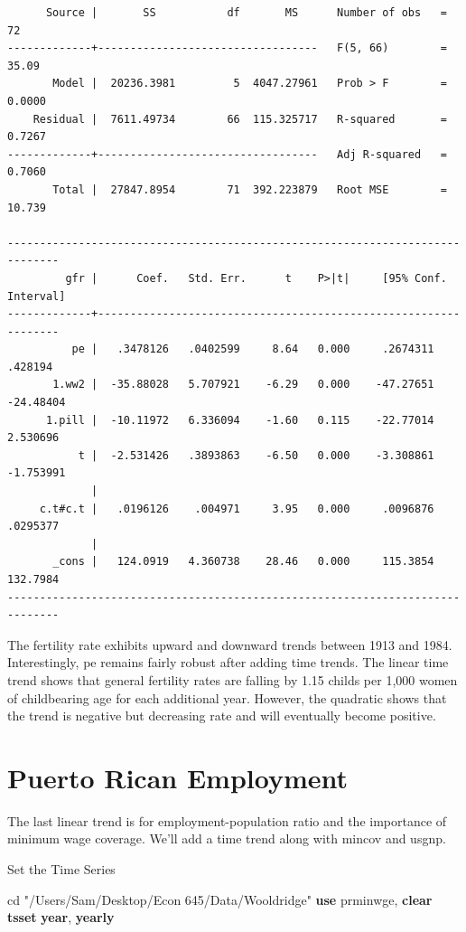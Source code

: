 \documentclass[
]{book}
\newenvironment{Shaded}{\begin{snugshade}}{\end{snugshade}}
\newcommand{\FunctionTok}[1]{\textcolor[rgb]{0.13,0.29,0.53}{\textbf{#1}}}
\newcommand{\KeywordTok}[1]{\textcolor[rgb]{0.13,0.29,0.53}{\textbf{#1}}}
\newcommand{\NormalTok}[1]{#1}
\newcommand{\StringTok}[1]{\textcolor[rgb]{0.31,0.60,0.02}{#1}}
\begin{document}
\begin{verbatim}
      Source |       SS           df       MS      Number of obs   =        72
-------------+----------------------------------   F(5, 66)        =     35.09
       Model |  20236.3981         5  4047.27961   Prob > F        =    0.0000
    Residual |  7611.49734        66  115.325717   R-squared       =    0.7267
-------------+----------------------------------   Adj R-squared   =    0.7060
       Total |  27847.8954        71  392.223879   Root MSE        =    10.739

------------------------------------------------------------------------------
         gfr |      Coef.   Std. Err.      t    P>|t|     [95% Conf. Interval]
-------------+----------------------------------------------------------------
          pe |   .3478126   .0402599     8.64   0.000     .2674311     .428194
       1.ww2 |  -35.88028   5.707921    -6.29   0.000    -47.27651   -24.48404
      1.pill |  -10.11972   6.336094    -1.60   0.115    -22.77014    2.530696
           t |  -2.531426   .3893863    -6.50   0.000    -3.308861   -1.753991
             |
     c.t#c.t |   .0196126    .004971     3.95   0.000     .0096876    .0295377
             |
       _cons |   124.0919   4.360738    28.46   0.000     115.3854    132.7984
------------------------------------------------------------------------------
\end{verbatim}

The fertility rate exhibits upward and downward trends between 1913 and 1984.
Interestingly, pe remains fairly robust after adding time trends. The linear
time trend shows that general fertility rates are falling by 1.15 childs per 1,000
women of childbearing age for each additional year. However, the quadratic shows
that the trend is negative but decreasing rate and will eventually become positive.

\section{Puerto Rican Employment}\label{puerto-rican-employment}

The last linear trend is for employment-population ratio and the importance of minimum wage
coverage. We'll add a time trend along with mincov and usgnp.

Set the Time Series

\begin{Shaded}
\begin{Highlighting}[]
\NormalTok{cd }\StringTok{"/Users/Sam/Desktop/Econ 645/Data/Wooldridge"}
\KeywordTok{use}\NormalTok{ prminwge, }\KeywordTok{clear}
\KeywordTok{tsset} \FunctionTok{year}\NormalTok{, }\FunctionTok{yearly}
\end{Highlighting}
\end{Shaded}
\end{document}
